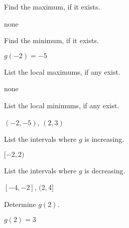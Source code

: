 \documentclass{ximera}
\begin{document}
\begin{question}
Find the maximum, if it exists.
\begin{solution}
none

\end{solution}

\end{question}

\begin{question}
Find the minimum, if it exists. 

\begin{solution}
$g(-2) = -5$
\end{solution}

\end{question}

\begin{question}
List the local maximums, if any exist.
\begin{solution}
none
\end{solution}

\end{question}

\begin{question}
List the local minimums, if any exist.

\begin{solution}
$(-2,-5)$, $(2,3)$

\end{solution}

\end{question}

\begin{question}
List the intervals where $g$ is increasing.
\begin{solution}
$[-2,2)$
\end{solution}

\end{question}

\begin{question}
List the intervals where $g$ is decreasing.

\begin{solution}
$[-4, -2]$, $(2,4]$
\end{solution}

\end{question}

\begin{question}
Determine $g(2)$.
\begin{solution}
$g(2) = 3$

\end{solution}

\end{question}
\end{document}
